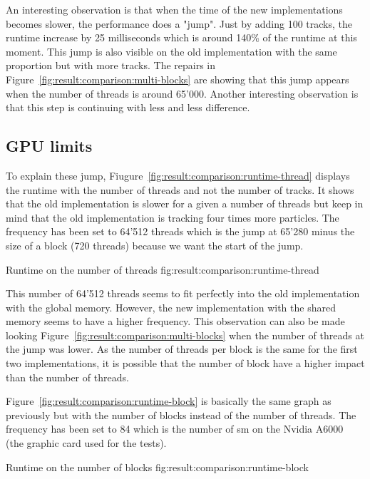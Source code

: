 An interesting observation is that when the time of the new implementations
becomes slower, the performance does a "jump".
Just by adding 100 tracks, the runtime increase by 25 milliseconds which is
around 140\% of the runtime at this moment.
This jump is also visible on the old implementation with the same proportion but
with more tracks.
The repairs in Figure~\ref{fig:result:comparison:multi-blocks} are showing that
this jump appears when the number of threads is around 65'000.
Another interesting observation is that this step is continuing with less and
less difference.

\subsection{GPU limits}
\label{ch:result:comparison:gpu}

To explain these jump, Fiugure~\ref{fig:result:comparison:runtime-thread}
displays the runtime with the number of threads and not the number of tracks.
It shows that the old implementation is slower for a given a number of
threads but keep in mind that the old implementation is tracking four times
more particles.
The frequency has been set to 64'512 threads which is the jump at 65'280 minus
the size of a block (720 threads) because we want the start of the jump.

{Runtime on the number of threads}
{fig:result:comparison:runtime-thread}

This number of 64'512 threads seems to fit perfectly into the old implementation
with the global memory.
However, the new implementation with the shared memory seems to have a higher
frequency.
This observation can also be made looking Figure~\ref{fig:result:comparison:multi-blocks}
when the number of threads at the jump was lower.
As the number of threads per block is the same for the first two implementations,
it is possible that the number of block have a higher impact than the number of
threads.

Figure~\ref{fig:result:comparison:runtime-block} is basically the same graph as
previously but with the number of blocks instead of the number of threads.
The frequency has been set to 84 which is the number of \acrshort{sm} on the
Nvidia A6000~\cite{nvidia-a6000} (the graphic card used for the tests).

{Runtime on the number of blocks}
{fig:result:comparison:runtime-block}

